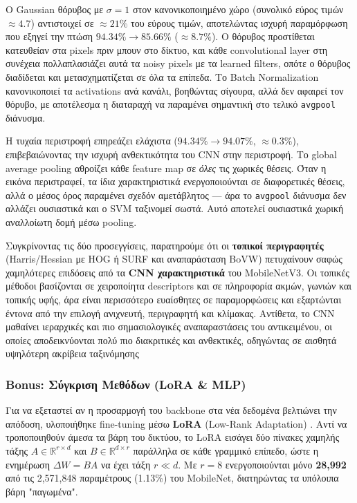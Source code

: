 \documentclass[12pt, a4paper]{article}
\begin{document}
Ο Gaussian θόρυβος με $\sigma{=}1$ στον κανονικοποιημένο χώρο (συνολικό
εύρος τιμών $\approx 4.7$) αντιστοιχεί σε $\approx 21\%$ του εύρους
τιμών, αποτελώντας ισχυρή παραμόρφωση που εξηγεί την πτώση
$94.34\% \to 85.66\%$ ($\approx 8.7\%$). Ο θόρυβος προστίθεται
κατευθείαν στα pixels πριν μπουν στο δίκτυο, και κάθε convolutional layer
στη συνέχεια πολλαπλασιάζει αυτά τα noisy pixels με τα learned filters,
οπότε ο θόρυβος διαδίδεται και μετασχηματίζεται σε όλα τα επίπεδα. Το
Batch Normalization κανονικοποιεί τα activations ανά κανάλι, βοηθώντας
σίγουρα, αλλά δεν αφαιρεί τον θόρυβο, με αποτέλεσμα η διαταραχή να
παραμένει σημαντική στο τελικό \texttt{avgpool} διάνυσμα.

Η τυχαία περιστροφή επηρεάζει ελάχιστα ($94.34\% \to 94.07\%$,
$\approx 0.3\%$), επιβεβαιώνοντας την ισχυρή ανθεκτικότητα του CNN στην
περιστροφή. Το global average pooling αθροίζει κάθε feature map σε
\emph{όλες} τις χωρικές θέσεις. Όταν η εικόνα περιστραφεί, τα ίδια
χαρακτηριστικά ενεργοποιούνται σε διαφορετικές θέσεις, αλλά ο μέσος
όρος παραμένει σχεδόν αμετάβλητος — άρα το \texttt{avgpool} διάνυσμα
δεν αλλάζει ουσιαστικά και ο SVM ταξινομεί σωστά. Αυτό αποτελεί
ουσιαστικά χωρική αναλλοίωτη δομή μέσω pooling.

Συγκρίνοντας τις δύο προσεγγίσεις, παρατηρούμε ότι οι \textbf{τοπικοί περιγραφητές}
  (Harris/Hessian με HOG ή SURF και αναπαράσταση BoVW) πετυχαίνουν σαφώς χαμηλότερες
  επιδόσεις από τα \textbf{CNN χαρακτηριστικά} του MobileNetV3. Οι τοπικές μέθοδοι
  βασίζονται σε χειροποίητα descriptors και σε πληροφορία ακμών, γωνιών και τοπικής
  υφής, άρα είναι περισσότερο ευαίσθητες σε παραμορφώσεις και εξαρτώνται έντονα από
  την επιλογή ανιχνευτή, περιγραφητή και κλίμακας. Αντίθετα, το CNN μαθαίνει ιεραρχικές
  και πιο σημασιολογικές αναπαραστάσεις του αντικειμένου, οι οποίες αποδεικνύονται πολύ
  πιο διακριτικές και ανθεκτικές, οδηγώντας σε αισθητά υψηλότερη ακρίβεια ταξινόμησης
  
\subsubsection{Bonus: Σύγκριση Μεθόδων (LoRA \& MLP)}

Για να εξεταστεί αν η προσαρμογή του backbone στα νέα δεδομένα βελτιώνει
την απόδοση, υλοποιήθηκε fine-tuning μέσω \textbf{LoRA} (Low-Rank
Adaptation) \cite{hu2021lora}. Αντί να τροποποιηθούν άμεσα τα βάρη του
δικτύου, το LoRA εισάγει δύο πίνακες χαμηλής τάξης $A \in
\mathbb{R}^{r \times d}$ και $B \in \mathbb{R}^{d \times r}$ παράλληλα σε
κάθε γραμμικό επίπεδο, ώστε η ενημέρωση $\Delta W = BA$ να έχει τάξη $r
\ll d$. Με $r = 8$ ενεργοποιούνται μόνο \textbf{28{,}992} από τις
2{,}571{,}848 παραμέτρους (1.13\%) του MobileNet, διατηρώντας τα υπόλοιπα βάρη "παγωμένα".
\end{document}
